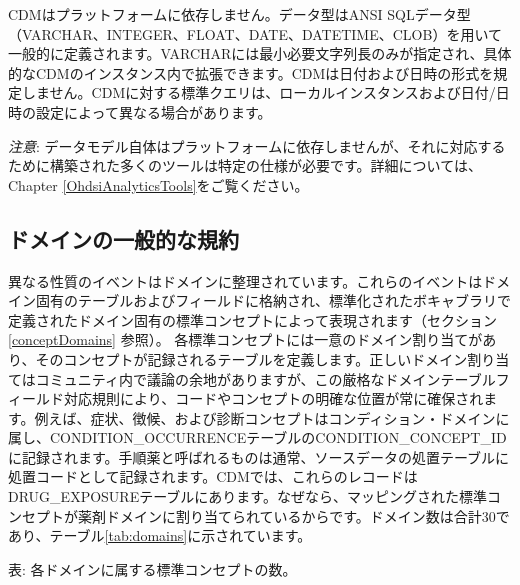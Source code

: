 \documentclass[
  11pt]{book}
\theoremstyle{definition}
\theoremstyle{definition}
\theoremstyle{definition}
\theoremstyle{definition}
\theoremstyle{remark}
\begin{document}
CDMはプラットフォームに依存しません。データ型はANSI SQLデータ型（VARCHAR、INTEGER、FLOAT、DATE、DATETIME、CLOB）を用いて一般的に定義されます。VARCHARには最小必要文字列長のみが指定され、具体的なCDMのインスタンス内で拡張できます。CDMは日付および日時の形式を規定しません。CDMに対する標準クエリは、ローカルインスタンスおよび日付/日時の設定によって異なる場合があります。

\emph{注意}: データモデル自体はプラットフォームに依存しませんが、それに対応するために構築された多くのツールは特定の仕様が必要です。詳細については、Chapter \ref{OhdsiAnalyticsTools}をご覧ください。

\subsection{ドメインの一般的な規約}\label{domains}

異なる性質のイベントはドメインに整理されています。これらのイベントはドメイン固有のテーブルおよびフィールドに格納され、標準化されたボキャブラリで定義されたドメイン固有の標準コンセプトによって表現されます（セクション \ref{conceptDomains} 参照）。 各標準コンセプトには一意のドメイン割り当てがあり、そのコンセプトが記録されるテーブルを定義します。正しいドメイン割り当てはコミュニティ内で議論の余地がありますが、この厳格なドメインテーブルフィールド対応規則により、コードやコンセプトの明確な位置が常に確保されます。例えば、症状、徴候、および診断コンセプトはコンディション・ドメインに属し、CONDITION\_OCCURRENCEテーブルのCONDITION\_CONCEPT\_IDに記録されます。手順薬と呼ばれるものは通常、ソースデータの処置テーブルに処置コードとして記録されます。CDMでは、これらのレコードはDRUG\_EXPOSUREテーブルにあります。なぜなら、マッピングされた標準コンセプトが薬剤ドメインに割り当てられているからです。ドメイン数は合計30であり、テーブル\ref{tab:domains}に示されています。

表: \label{tab:domains} 各ドメインに属する標準コンセプトの数。
\end{document}
